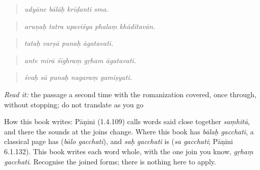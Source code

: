 \begin{tcolorbox}[breakable,skin=enhanced,colback=orange!6,colframe=orange!45!black,boxrule=0.5pt,arc=1mm,left=6pt,right=6pt,top=4pt,bottom=4pt,fonttitle=\bfseries,title={Read this}]
\begin{quote}
\emph{udyāne bālāḥ krīḍanti sma.}
\end{quote}

\begin{quote}
\textbf{    }
\end{quote}

\begin{quote}
\emph{aruṇaḥ tatra upaviśya phalaṃ khāditavān.}
\end{quote}

\begin{quote}
\textbf{   }
\end{quote}

\begin{quote}
\emph{tataḥ varṣā punaḥ āgatavatī.}
\end{quote}

\begin{quote}
\textbf{    }
\end{quote}

\begin{quote}
\emph{ante mīrā śīghraṃ gṛham āgatavatī.}
\end{quote}

\begin{quote}
\textbf{    }
\end{quote}

\begin{quote}
\emph{śvaḥ sā punaḥ nagaraṃ gamiṣyati.}
\end{quote}

\emph{Read it:} the passage a second time with the romanization covered, once through, without stopping; do not translate as you go
\end{tcolorbox}

\begin{culture}
How this book writes: Pāṇini (1.4.109) calls words said close together \emph{saṃhitā}, and there the sounds at the joins change. Where this book has \emph{bālaḥ gacchati}, a classical page has \textbf{ } (\emph{bālo gacchati}), and \emph{saḥ gacchati} is \textbf{ } (\emph{sa gacchati}; Pāṇini 6.1.132). This book writes each word whole, with the one join you know, \emph{gṛhaṃ gacchati}. Recognise the joined forms; there is nothing here to apply.
\end{culture}

